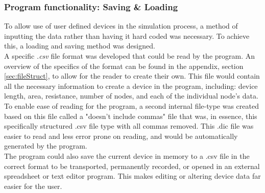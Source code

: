 \documentclass[titlepage]{article}
\begin{document}
\subsubsection{Program functionality: Saving \& Loading}
To allow use of user defined devices in the simulation process, a method of inputting the data rather than having it hard coded was necessary. To achieve this, a loading and saving method was designed.\\
A specific \textit{.csv} file format was developed that could be read by the program. An overview of the specifics of the format can be found in the appendix, section \ref{sec:fileStruct}, to allow for the reader to create their own. This file would contain all the necessary information to create a device in the program, including: device length, area, resistance, number of nodes, and each of the individual node's data. To enable ease of reading for the program, a second internal file-type was created based on this file called a "doesn't include commas" file that was, in essence, this specifically structured .csv file type with all commas removed. This .dic file was easier to read and less error prone on reading, and would be automatically generated by the program.\\
The program could also save the current device in memory to a .csv file in the correct format to be transported, permanently recorded, or opened in an external spreadsheet or text editor program. This makes editing or altering device data far easier for the user.
\end{document}
